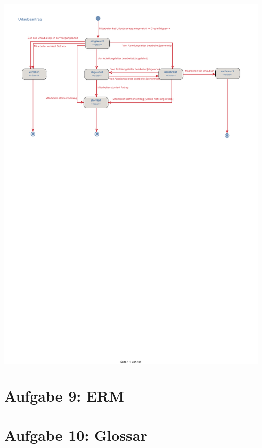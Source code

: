 \begin{center}
\includegraphics[width=0.95\linewidth]{Aktivitaet_Urlaubsantrag}
\end{center}

\chapter*{Aufgabe 9: ERM}
\setcounter{section}{0}
\addtocounter{chapter}{1}

\chapter*{Aufgabe 10: Glossar}
\setcounter{section}{0}
\addtocounter{chapter}{1}


